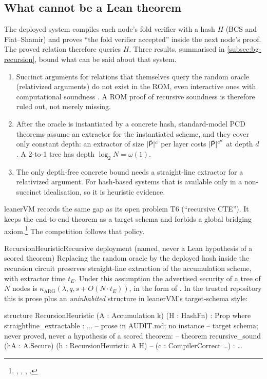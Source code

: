 \subsection{What cannot be a Lean theorem}\label{subsec:rec-cannot}

The deployed system compiles each node's fold verifier with a hash $H$ (BCS and Fiat--Shamir) and
proves \enquote{the fold verifier accepted} inside the next node's proof. The proved relation
therefore queries $H$. Three results, summarised in \cref{subsec:bg-recursion}, bound what can be
said about that system.
\begin{enumerate}[nosep]
\item Succinct arguments for relations that themselves query the random oracle (relativized
  arguments) do not exist in the ROM, even interactive ones with computational soundness
  \cite{BCG24-RelROM}. A ROM proof of recursive soundness is therefore ruled out, not merely missing.
\item After the oracle is instantiated by a concrete hash, standard-model PCD theorems assume an
  extractor for the instantiated scheme, and they cover only constant depth: an extractor of size
  $|\tilde{\mathsf{P}}|^c$ per layer costs $|\tilde{\mathsf{P}}|^{c^d}$ at depth $d$ \cite[Rmk.~5.3]{BCMS20}. A
  2-to-1 tree has depth $\log_2N=\omega(1)$.
\item The only depth-free concrete bound \cite{CGSY24} needs a straight-line extractor for a
  relativized argument. For hash-based systems that is available only in a non-succinct idealisation,
  so it is heuristic evidence.
\end{enumerate}
leanerVM records the same gap as its open problem T6 (\enquote{recursive CTE}). It keeps the
end-to-end theorem as a target schema and forbids a global bridging axiom.\footnote{, ,
, .} The competition follows that policy.

\begin{assumption}{RecursionHeuristic}{Recursive deployment (named, never a Lean hypothesis of a scored theorem)}
Replacing the random oracle by the deployed hash inside the recursion circuit preserves straight-line
extraction of the accumulation scheme, with extractor time $t_E$. Under this assumption the advertised
security of a tree of $N$ nodes is $\kappa_{\mathrm{ARG}}(\lambda,q,s+O(N\cdot t_E))$, in the form
of \cite{CGSY24}. In the trusted repository this is prose plus an \emph{uninhabited} structure in
leanerVM's target-schema style:
\begin{leancode}
structure RecursionHeuristic (A : Accumulation k) (H : HashFn) : Prop where
  straightline_extractable : ...   -- prose in AUDIT.md; no instance
-- target schema; never proved, never a hypothesis of a scored theorem:
-- theorem recursive_sound (hA : A.Secure) (h : RecursionHeuristic A H)
--     (c : CompilerCorrect …) : …
\end{leancode}
\end{assumption}

